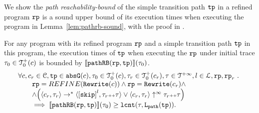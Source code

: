 We show the \emph{path reachability-bound} of the simple transition path $\mathtt{tp}$ in a refined program $\mathtt{rp}$ is a sound upper bound of its execution times when executing the program in Lemma~\ref{lem:pathrb-sound}, with the proof in .
\begin{lem}
  \label{lem:pathrb-sound}
  For any program with its refined program $\mathtt{rp}$ and a simple transition path $\mathtt{tp}$ in this program,
  the execution times of $\mathtt{tp}$ when executing the $\mathtt{rp}$ under initial trace $\mathtt{\tau}_0 \in \mathcal{T}^{+}_0(c)$ is bounded by $\llbracket \mathtt{pathRB}(\mathtt{rp}, \mathtt{tp}) \rrbracket(\mathtt{\tau}_0)$.
  \[
    \begin{array}{l}
    \forall c, c_r \in \cdom, \tpath \in \absG(c), \trace_0 \in \ftdom_0(c),  \trace_r \in \ftdom_0(c_r), \trace \in \tdom, l \in \ldom, \rprog, \rprog_r \st 
    \\ \qquad
    \rprog = REFINE(\algrewrite(c))
    \land 
    \rprog = \algrewrite(c_r)
    \land
    \\ \qquad
    \land 
    \Big(
      \config{c_r, \trace_r} \rightarrow^* \config{\clabel{\eskip}^{l}, \trace_r \tracecat \trace}
      \lor \config{c_r, \trace_r} \uparrow^{\infty} \trace_r \tracecat \trace 
      \Big)
  \\ \qquad
    \implies
    \econfig{\inoutB(\rprog, \tpath)}(\trace_0) \geq \lcounter(\trace, \pathl(\tpath)).
    \end{array}
  \]  
\end{lem}

